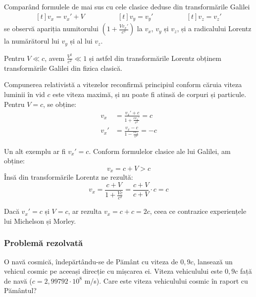 Comparând formulele de mai sus cu cele clasice deduse din transformările
Galilei
\begin{equation*}
    \begin{aligned}[t]
        v_x = v_x' + V
    \end{aligned}\qquad\qquad
    \begin{aligned}[t]
        v_y = v_y'
    \end{aligned}\qquad\qquad
    \begin{aligned}[t]
        v_z = v_z'
    \end{aligned}
\end{equation*}
se observă apariția numitorului \( \left( 1 + \frac{Vv_x'}{c^2} \right) \) la
$v_x$, $v_y$ și $v_z$, și a radicalului Lorentz la numărătorul lui $v_y$ și al
lui $v_z$.

Pentru \( V \ll c \), avem \( \frac{V^2}{c^2} \ll 1 \) și astfel din
transformările Lorentz obținem transformările Galilei din fizica clasică.

Compunerea relativistă a vitezelor reconfirmă principiul conform căruia viteza
luminii în vid $c$ este viteza maximă, și nu poate fi atinsă de corpuri și
particule. Pentru \( V = c \), se obține:
\begin{equation*}
    \begin{aligned}
        v_x &= \frac{v_x' + c}{1 + \frac{cv_x'}{c^2}} = c \\
        v_x' &= \frac{v_x - c}{1 - \frac{cv_x}{c^2}} = -c
    \end{aligned}
\end{equation*}

Un alt exemplu ar fi \( v_x' = c \). Conform formulelor clasice ale lui Galilei, am obține:
\[ v_x = c + V > c \]
Însă din transformările Lorentz ne rezultă:
\[ v_x = \frac{c + V}{1 + \frac{Vc}{c^2}} = \frac{c + V}{c + V} \cdot c = c \]

Dacă \( v_x' = c \) și \( V = c \), ar rezulta \( v_x = c + c = 2c \), ceea ce
contrazice experiențele lui Michelson și Morley.

\pagebreak

\subsubsection*{Problemă rezolvată}

O navă cosmică, îndepărtându-se de Pământ cu viteza de $0,9c$, lansează un
vehicul cosmic pe aceeași direcție cu mișcarea ei. Viteza vehiculului este
$0,9c$ față de navă ($c = 2,99792 \cdot 10^8$  m/s). Care este viteza
vehiculului cosmic în raport cu Pământul?

